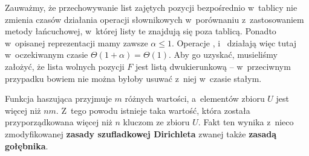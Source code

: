 Zauważmy, że przechowywanie list zajętych pozycji bezpośrednio w~tablicy nie zmienia czasów działania operacji słownikowych w~porównaniu z~zastosowaniem metody łańcuchowej, w~której listy te znajdują się poza tablicą.
Ponadto w~opisanej reprezentacji mamy zawsze $\alpha\le1$.
Operacje ,  i~ działają więc tutaj w~oczekiwanym czasie $\Theta(1+\alpha)=\Theta(1)$.
Aby go uzyskać, musieliśmy założyć, że lista wolnych pozycji $F$ jest listą dwukierunkową -- w~przeciwnym przypadku bowiem nie można byłoby usuwać z~niej w~czasie stałym.

\exercise %
Funkcja haszująca przyjmuje $m$ różnych wartości, a~elementów zbioru $U$ jest więcej niż $nm$.
Z~tego powodu istnieje taka wartość, która została przyporządkowana więcej niż $n$ kluczom ze zbioru $U$.
Fakt ten wynika z~nieco zmodyfikowanej \textbf{zasady szufladkowej Dirichleta} \cite{pigeonholeprinciple} zwanej także \textbf{zasadą gołębnika}.
